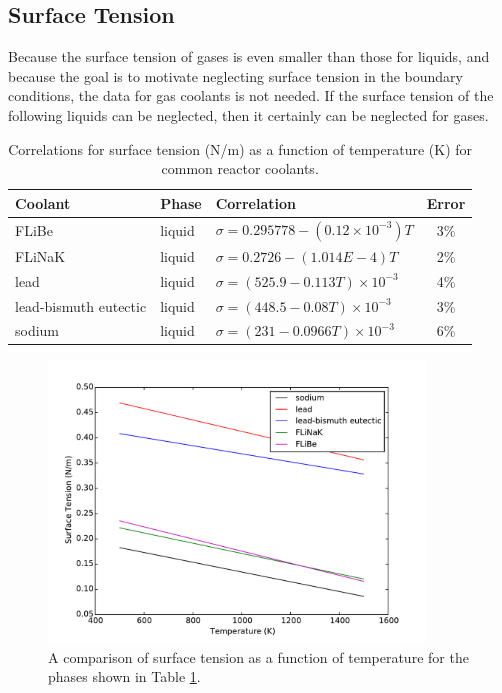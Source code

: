 \documentclass[10pt]{article}
\numberwithin{equation}{section} %
\begin{document}
\subsection{Surface Tension}

Because the surface tension of gases is even smaller than those for liquids, and because the goal is to motivate neglecting surface tension in the boundary conditions, the data for gas coolants is not needed. If the surface tension of the following liquids can be neglected, then it certainly can be neglected for gases.

\begin{table}[H]
\caption{Correlations for surface tension (N/m) as a function of temperature (K) for common reactor coolants.}
\centering
\begin{tabular}{l l l c}
\hline\hline
Coolant & Phase & Correlation & Error\\ [0.5ex]
\hline
FLiBe \cite{saltproperties}				& liquid		& \(\sigma=0.295778-(0.12\times10^{-3})T\)	& 3\%\\
FLiNaK \cite{saltproperties}			& liquid		& \(\sigma=0.2726-(1.014E-4)T\)			& 2\%\\
lead \cite{LMproperties}				& liquid		& \(\sigma=(525.9-0.113T)\times10^{-3}\) 		& 4\%\\
lead-bismuth eutectic \cite{LMproperties}	& liquid		& \(\sigma=(448.5-0.08T)\times10^{-3}\)		& 3\%\\
sodium \cite{LMproperties}			& liquid 		& \(\sigma=(231-0.0966T)\times10^{-3}\) 		& 6\%\\
\hline
\end{tabular}
\label{table:SurfaceTensions}
\end{table}

\begin{figure}[H]
  \centering
  \includegraphics[width=10cm]{figures/SurfaceTensions.pdf}
  \caption{A comparison of surface tension as a function of temperature for the phases shown in Table \ref{table:SurfaceTensions}.}
  \label{fig:SurfaceTensions}
\end{figure}
\end{document}
